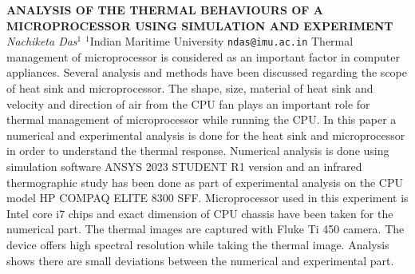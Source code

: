 
    \begin{conf-abstract}[]
        {\textbf{ANALYSIS OF THE THERMAL BEHAVIOURS OF A MICROPROCESSOR USING SIMULATION AND EXPERIMENT}}
        {\textit{Nachiketa Das$^{1}$}}
        {$^{1}$Indian Maritime University}
        {\texttt{ndas@imu.ac.in}}
        {Thermal management of microprocessor is considered as an important factor in computer appliances. Several analysis and methods have been discussed regarding the scope of heat sink and microprocessor. The shape, size, material of heat sink and velocity and direction of air from the CPU fan plays an important role for thermal management of microprocessor while running the CPU.  In this paper a numerical and experimental analysis is done for the heat sink and microprocessor in order to understand the thermal response. Numerical analysis is done using simulation software ANSYS 2023 STUDENT R1 version and an infrared thermographic study has been done as part of experimental analysis on the CPU model HP COMPAQ ELITE 8300 SFF. Microprocessor used in this experiment is Intel core i7 chips and exact dimension of CPU chassis have been taken for the numerical part. The thermal images are captured with Fluke Ti 450 camera. The device offers high spectral resolution while taking the thermal image. Analysis shows there are small deviations between the numerical and experimental part. }
    \end{conf-abstract}
        